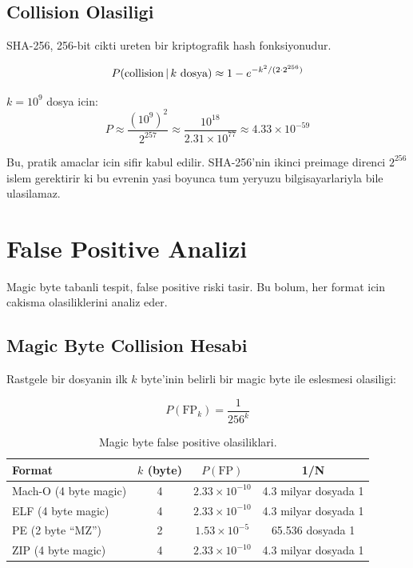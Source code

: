 \subsection{Collision Olasiligi}

SHA-256, 256-bit cikti ureten bir kriptografik hash fonksiyonudur.

\begin{equation}
\label{eq:collision-birthday}
P(\text{collision} \,|\, k \text{ dosya}) \approx 1 - e^{-k^2 / (2 \cdot 2^{256})}
\end{equation}

$k = 10^{9}$ dosya icin:
\begin{equation}
\label{eq:collision-numeric}
P \approx \frac{(10^9)^2}{2^{257}} \approx \frac{10^{18}}{2.31 \times 10^{77}} \approx 4.33 \times 10^{-59}
\end{equation}

Bu, pratik amaclar icin sifir kabul edilir. SHA-256'nin ikinci preimage direnci $2^{256}$ islem gerektirir ki bu evrenin yasi boyunca tum yeryuzu bilgisayarlariyla bile ulasilamaz.


\section{False Positive Analizi}
\label{sec:false-positive}

Magic byte tabanli tespit, false positive riski tasir. Bu bolum, her format icin cakisma olasiliklerini analiz eder.

\subsection{Magic Byte Collision Hesabi}

Rastgele bir dosyanin ilk $k$ byte'inin belirli bir magic byte ile eslesmesi olasiligi:

\begin{equation}
\label{eq:magic-fp}
P(\text{FP}_k) = \frac{1}{256^k}
\end{equation}

\begin{table}[htbp]
\centering
\begin{tabular}{lccc}
\toprule
\textbf{\color{sectioncyan}Format} & \textbf{\color{sectioncyan}$k$ (byte)} & \textbf{\color{sectioncyan}$P(\text{FP})$} & \textbf{\color{sectioncyan}1/N} \\
\midrule
Mach-O (4 byte magic)    & 4 & $2.33 \times 10^{-10}$ & 4.3 milyar dosyada 1 \\
ELF (4 byte magic)       & 4 & $2.33 \times 10^{-10}$ & 4.3 milyar dosyada 1 \\
PE (2 byte ``MZ'')       & 2 & $1.53 \times 10^{-5}$  & 65.536 dosyada 1 \\
ZIP (4 byte magic)       & 4 & $2.33 \times 10^{-10}$ & 4.3 milyar dosyada 1 \\
\bottomrule
\end{tabular}
\caption{Magic byte false positive olasiliklari.}
\label{tab:magic-fp}
\end{table}

